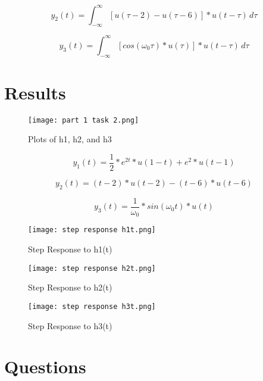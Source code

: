 \documentclass[12pt]{article}
\begin{document}
\begin{equation}
    y_2(t) = \int_{-\infty}^{\infty} [u(\tau-2) - u(\tau-6)] * u(t-\tau) \, d\tau
\end{equation}

\begin{equation}
    y_3(t) = \int_{-\infty}^{\infty} [cos(\omega_0 \tau) * u(\tau)] * u(t-\tau) \, d\tau
\end{equation}

\section{Results}

\begin{figure}[h!]
    \centering
    \texttt{[image: part 1 task 2.png]}
    \caption{Plots of h1, h2, and h3}
\end{figure}

\begin{equation}
    y_1(t) = \frac{1}{2} * e^{2t} * u(1-t) + e^{2} * u(t-1)
\end{equation}

\begin{equation}
    y_2(t) = (t-2) * u(t-2) - (t-6) * u(t-6)
\end{equation}

\begin{equation}
    y_3(t) = \frac{1}{\omega_0} * sin(\omega_0 t) * u(t)
\end{equation}

\begin{figure}[h!]
    \centering
    \texttt{[image: step response h1t.png]}
    \caption{Step Response to h1(t)}
\end{figure}

\begin{figure}[h!]
    \centering
    \texttt{[image: step response h2t.png]}
    \caption{Step Response to h2(t)}
\end{figure}

\begin{figure}[h!]
    \centering
    \texttt{[image: step response h3t.png]}
    \caption{Step Response to h3(t)}
\end{figure}

\newpage

\section{Questions}
\end{document}
